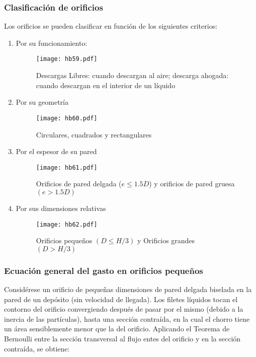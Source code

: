     \subsubsection{Clasificación de orificios}
    Los orificios se pueden clasificar en función de los siguientes criterios: 
    \begin{enumerate}
        \item Por su funcionamiento:
        \begin{figure}[h!]
        \centering
          \texttt{[image: hb59.pdf]}
          \caption{Descargas Libres: cuando descargan al aire; descarga ahogada: cuando descargan en el interior de un líquido}
          \label{hb59}
        \end{figure}
        \item Por su geometría
        \begin{figure}[h!]
        \centering
          \texttt{[image: hb60.pdf]}
          \caption{Circulares, cuadrados y rectangulares}
          \label{hb60}
        \end{figure}
        \item Por el espesor de su pared
        \begin{figure}[h!]
        \centering
          \texttt{[image: hb61.pdf]}
          \caption{Orificios de pared delgada ($e\leq 1.5D$) y orificios de pared gruesa $(e>1.5D)$}
          \label{hb61}
        \end{figure}
        \item Por sus dimensiones relativas
        \begin{figure}[h!]
        \centering
          \texttt{[image: hb62.pdf]}
          \caption{Orificios pequeños $(D\leq H/3)$ y Orificios grandes $(D>H/3)$}
          \label{hb62}
        \end{figure}
    \end{enumerate}

    \subsubsection{Ecuación general del gasto en orificios pequeños}

    Considérese un orificio de pequeñas dimensiones de pared delgada biselada en la pared de un depósito (sin velocidad de llegada). Los filetes líquidos tocan el contorno del orificio convergiendo después de pasar por el mismo (debido a la inercia de las partículas), hasta una sección contraída, en la cual el chorro tiene un área sensiblemente menor que la del orificio. Aplicando el Teorema de Bernoulli entre la sección transversal al flujo entes del orificio y en la sección contraída, se obtiene:
    
